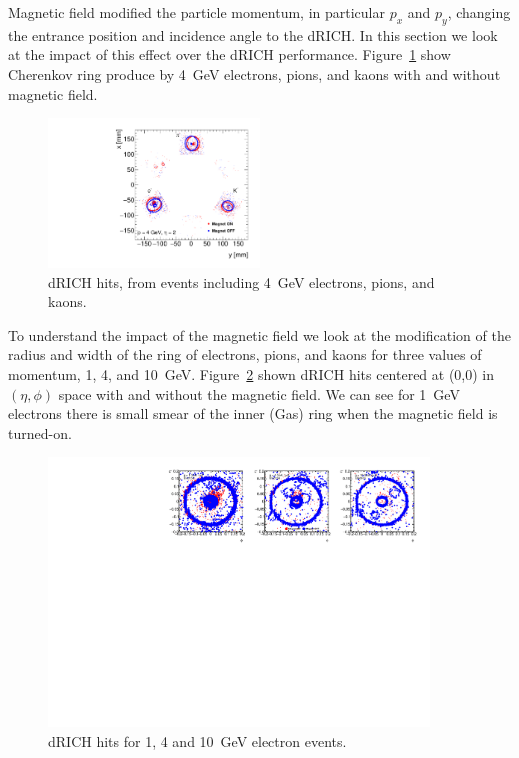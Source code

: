 Magnetic field modified the particle momentum, in particular $p_{x}$ and $p_{y}$, changing the entrance position and incidence angle to the dRICH. In this section we look at the impact of this effect over the dRICH performance. Figure~\ref{fig:drich_p4_xy} show Cherenkov ring produce by 4~GeV electrons, pions, and kaons with and without magnetic field. 
\begin{figure}[h!tbp]
    \centering
    \includegraphics[width=0.5\textwidth]{figs/rings_xy_p4_fornote.pdf}
    \caption{dRICH hits, from events including 4~GeV electrons, pions, and kaons.}
    \label{fig:drich_p4_xy}
\end{figure}
To understand the impact of the magnetic field we look at the modification of the radius and width of the ring of electrons, pions, and kaons for three values of momentum, 1, 4, and 10~GeV. Figure~\ref{fig:drich_pX_e} shown dRICH hits centered at (0,0) in $(\eta,\phi)$ space with and without the magnetic field. We can see for 1~GeV electrons there is small smear of the inner (Gas) ring when the magnetic field is turned-on. 
\begin{figure}[h!tbp]
    \centering
    \includegraphics[width=0.9\textwidth]{figs/rings_etaphi_electron.pdf}
    \caption{dRICH hits for 1, 4 and 10~GeV electron events.}
    \label{fig:drich_pX_e}
\end{figure}

